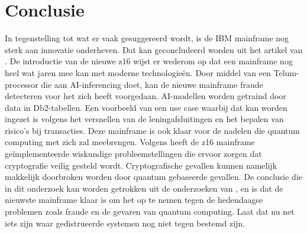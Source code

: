 
\chapter{Conclusie}
\label{ch:conclusie}



In tegenstelling tot wat er vaak gesuggereerd wordt, is de IBM mainframe nog sterk aan innovatie onderheven. Dat kan geconcludeerd worden uit het artikel van \textcite{Almekinders2022}. De introductie van de nieuwe z16 wijst er wederom op dat een mainframe nog heel wat jaren mee kan met moderne technologieën. Door middel van een Telum-processor die aan AI-inferencing doet, kan de nieuwe mainframe fraude detecteren voor het zich heeft voorgedaan. AI-modellen worden getraind door data in Db2-tabellen. Een voorbeeld van een use case waarbij dat kan worden ingezet is volgens \textcite{Sarkar2020} het versnellen van de leningafsluitingen en het bepalen van risico's bij transacties. Deze mainframe is ook klaar voor de nadelen die quantum computing met zich zal meebrengen. Volgens \textcite{Almekinders2022} heeft de z16 mainframe geïmplementeerde wiskundige probleemstellingen die ervoor zorgen dat cryptografie veilig gesteld wordt. Cryptografische gevallen kunnen namelijk makkelijk doorbroken worden door quantum gebaseerde gevallen. De conclusie die in dit onderzoek kan worden getrokken uit de onderzoeken van \textcite{Almekinders2022}, \textcite{Sarkar2020} en \textcite{Cammarota2020} is dat de nieuwste mainframe klaar is om het op te nemen tegen de hedendaagse problemen zoals fraude en de gevaren van quantum computing. Laat dat nu net iets zijn waar gedistrueerde systemen nog niet tegen bestemd zijn. 

